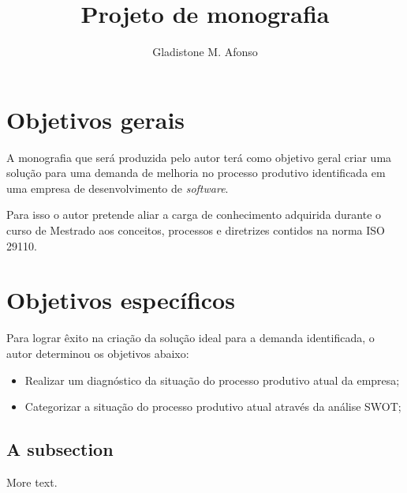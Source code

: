 
\newcommand{\sw}{\textit{software}\xspace}
\newcommand{\iso}{ISO 29110\xspace}

\title{Projeto de monografia}
\author{Gladistone M. Afonso}
\date{} %


\maketitle

\section{Objetivos gerais}

A monografia que será produzida pelo autor terá como objetivo geral criar uma solução para uma demanda de melhoria no processo produtivo identificada em uma empresa de desenvolvimento de \sw.

Para isso o autor pretende aliar a carga de conhecimento adquirida durante o curso de Mestrado aos conceitos, processos e diretrizes contidos na norma \iso.

\section{Objetivos específicos}

Para lograr êxito na criação da solução ideal para a demanda identificada, o autor determinou os objetivos abaixo:

\begin{itemize}

\item Realizar um diagnóstico da situação do processo produtivo atual da empresa;

\item Categorizar a situação do processo produtivo atual através da análise SWOT\footnotemark;


\end{itemize}

\subsection{A subsection}

More text.
